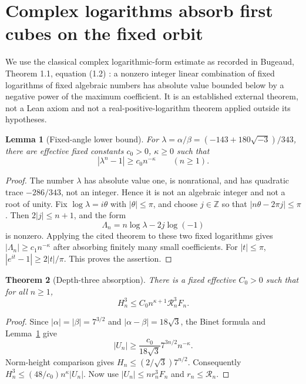 \documentclass[11pt]{amsart}
\newtheorem{theorem}{Theorem}[section]
\newtheorem{lemma}[theorem]{Lemma}
\theoremstyle{definition}\newtheorem{definition}[theorem]{Definition}
\theoremstyle{remark}\newtheorem{remark}[theorem]{Remark}
\newcommand{\Z}{\mathbb Z}\newcommand{\N}{\mathbb N}
\begin{document}
\section{Complex logarithms absorb first cubes on the fixed orbit}
We use the classical complex logarithmic-form estimate as recorded in Bugeaud, Theorem 1.1, equation (1.2) \cite{bugeaud}: a nonzero integer linear combination of fixed logarithms of fixed algebraic numbers has absolute value bounded below by a negative power of the maximum coefficient. It is an established external theorem, not a Lean axiom and not a real-positive-logarithm theorem applied outside its hypotheses.

\begin{lemma}[Fixed-angle lower bound]\label{lem:angle}
For $\lambda=\alpha/\beta=(-143+180\sqrt{-3})/343$, there are effective fixed constants $c_0>0$, $\kappa\ge0$ such that
\[
 |\lambda^n-1|\ge c_0n^{-\kappa}\qquad(n\ge1).
\]
\end{lemma}
\begin{proof}
The number $\lambda$ has absolute value one, is nonrational, and has quadratic trace $-286/343$, not an integer. Hence it is not an algebraic integer and not a root of unity. Fix $\log\lambda=i\theta$ with $|\theta|\le\pi$, and choose $j\in\Z$ so that $|n\theta-2\pi j|\le\pi$. Then $2|j|\le n+1$, and the form
\[
 \Lambda_n=n\log\lambda-2j\log(-1)
\]
is nonzero. Applying the cited theorem to these two fixed logarithms gives $|\Lambda_n|\ge c_1n^{-\kappa}$ after absorbing finitely many small coefficients. For $|t|\le\pi$, $|e^{it}-1|\ge2|t|/\pi$. This proves the assertion.
\end{proof}

\begin{theorem}[Depth-three absorption]\label{thm:three}
There is a fixed effective $C_0>0$ such that for all $n\ge1$,
\[
 H_n^3\le C_0 n^{\kappa+1}\mathscr R_n^3 F_n.
\]
\end{theorem}
\begin{proof}
Since $|\alpha|=|\beta|=7^{3/2}$ and $|\alpha-\beta|=18\sqrt3$, the Binet formula and Lemma~\ref{lem:angle} give
\[
 |U_n|\ge\frac{c_0}{18\sqrt3}7^{3n/2}n^{-\kappa}.
\]
Norm-height comparison gives $H_n\le(2/\sqrt3)7^{n/2}$. Consequently $H_n^3\le(48/c_0)n^\kappa|U_n|$. Now use $|U_n|\le n r_n^3F_n$ and $r_n\le\mathscr R_n$.
\end{proof}
\end{document}
